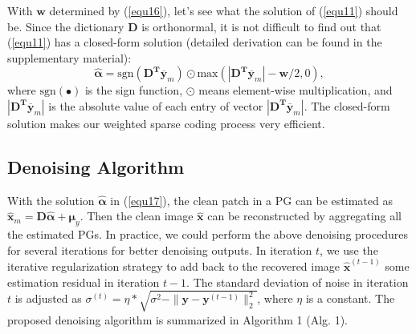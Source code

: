 With $\bm{w}$ determined by (\ref{equ16}), let's see what the solution of (\ref{equ11}) should be. Since the dictionary $\bm{D}$ is orthonormal, it is not difficult to find out that (\ref{equ11}) has a closed-form solution (detailed derivation can be found in the supplementary material):
\begin{equation}\label{equ17}
\hat{\bm{\alpha}}= \text{sgn}(\bm{D^{T}\overline{y}}_{m})\odot \text{max}(|\bm{D^{T}\overline{y}}_{m}|-\bm{w}/2,0),
\end{equation}
where $\text{sgn}(\bullet)$ is the sign function, $\odot$ means element-wise multiplication, and $|\bm{D^{T}\overline{y}}_{m}|$ is the absolute value of each entry of vector $|\bm{D^{T}\overline{y}}_{m}|$. The closed-form solution makes our weighted sparse coding process very efficient. 
\subsection{Denoising Algorithm}
With the solution $\hat{\bm{\alpha}}$ in (\ref{equ17}), the clean patch in a PG can be estimated as $\hat{\bm{x}}_{m}=\bm{D}\hat{\bm{\alpha}}+\bm{\mu}_{y}$. Then the clean image $\hat{\bm{x}}$ can be reconstructed by aggregating all the estimated PGs. In practice, we could perform the above denoising procedures for several iterations for better denoising outputs. In iteration $t$, we use the iterative regularization strategy \cite{osher2005iterative} to add back to the recovered image $\hat{\bm{x}}^{(t-1)}$ some estimation residual in iteration $t-1$. The standard deviation of noise in iteration $t$ is adjusted as $\sigma^{(t)} = \eta*\sqrt{\sigma^{2}-\|\bm{y}-\bm{y}^{(t-1)}\|_{2}^{2}}$, where $\eta$ is a constant. The proposed denoising algorithm is summarized in Algorithm 1 (Alg. 1).

